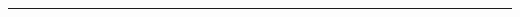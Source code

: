 \documentclass[a0]{a0poster}
\begin{document}
\begin{textblock}{7}
\begin{center}
\end{center}

\bigskip
\hrule
\end{textblock}
\end{document}
